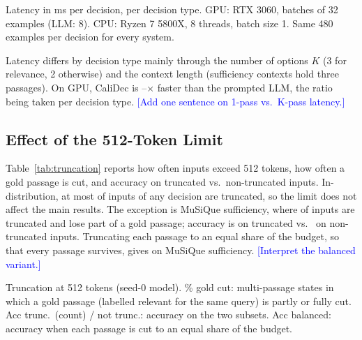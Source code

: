 \documentclass[twocolumn]{ICCKjournal}
\newcommand{\revnote}[1]{\textcolor{blue}{[#1]}}
\begin{document}
\begin{table}[H]
\caption{Latency in ms per decision, per decision type. GPU: RTX 3060, batches of 32 examples (LLM: 8). CPU: Ryzen 7 5800X, 8 threads, batch size 1. Same 480 examples per decision for every system.}
\label{tab:latency}
\centering
\small
\begin{adjustbox}{max width=\linewidth}

\end{adjustbox}
\end{table}

Latency differs by decision type mainly through the number of options $K$ (3 for relevance, 2 otherwise) and the context length (sufficiency contexts hold three passages). On GPU, CaliDec is \SpeedupMin--\SpeedupMax$\times$ faster than the prompted LLM, the ratio being taken per decision type. \revnote{Add one sentence on 1-pass vs.\ K-pass latency.}

\subsection{Effect of the 512-Token Limit}
\label{sec:truncation}
Table~\ref{tab:truncation} reports how often inputs exceed 512 tokens, how often a gold passage is cut, and accuracy on truncated vs.\ non-truncated inputs. In-distribution, at most \TruncInDistMax{} of inputs of any decision are truncated, so the limit does not affect the main results. The exception is MuSiQue sufficiency, where \TruncMusSufPct{} of inputs are truncated and \TruncMusSufGold{} lose part of a gold passage; accuracy is \TruncMusSufAccT{} on truncated vs.\ \TruncMusSufAccNT{} on non-truncated inputs. Truncating each passage to an equal share of the budget, so that every passage survives, gives \TruncMusSufAccBal{} on MuSiQue sufficiency. \revnote{Interpret the balanced variant.}

\begin{table}[t]
\caption{Truncation at 512 tokens (seed-0 model). \% gold cut: multi-passage states in which a gold passage (labelled relevant for the same query) is partly or fully cut. Acc trunc.\ (count) / not trunc.: accuracy on the two subsets. Acc balanced: accuracy when each passage is cut to an equal share of the budget.}
\label{tab:truncation}
\centering
\begin{adjustbox}{max width=\linewidth}

\end{adjustbox}
\end{table}
\end{document}
